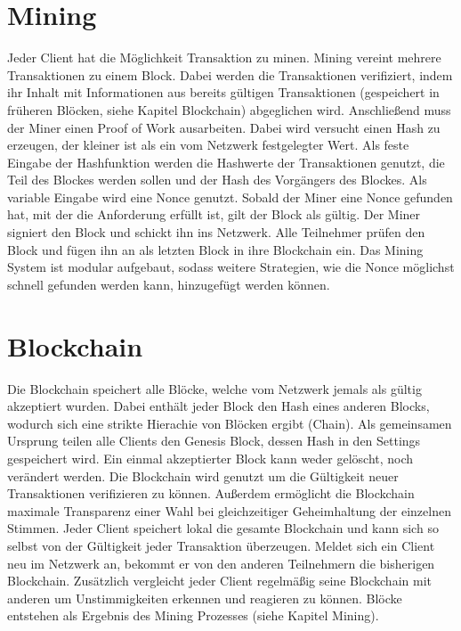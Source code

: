 \documentclass[colorback,accentcolor=tud1b]{tudreport}
\begin{document}
\section{Mining}
Jeder Client hat die Möglichkeit Transaktion zu minen. Mining vereint mehrere Transaktionen zu einem Block. Dabei werden die Transaktionen verifiziert, indem ihr Inhalt mit Informationen aus bereits gültigen Transaktionen (gespeichert in früheren Blöcken, siehe Kapitel Blockchain) abgeglichen wird. Anschließend muss der Miner einen Proof of Work ausarbeiten. Dabei wird versucht einen Hash zu erzeugen, der kleiner ist als ein vom Netzwerk festgelegter Wert. Als feste Eingabe der Hashfunktion werden die Hashwerte der Transaktionen genutzt, die Teil des Blockes werden sollen und der Hash des Vorgängers des Blockes. Als variable Eingabe wird eine Nonce genutzt. Sobald der Miner eine Nonce gefunden hat, mit der die Anforderung erfüllt ist, gilt der Block als gültig. Der Miner signiert den Block und schickt ihn ins Netzwerk. Alle Teilnehmer prüfen den Block und fügen ihn an als letzten Block in ihre Blockchain ein. Das Mining System ist modular aufgebaut, sodass weitere Strategien, wie die Nonce möglichst schnell gefunden werden kann, hinzugefügt werden können.
\section{Blockchain}
Die Blockchain speichert alle Blöcke, welche vom Netzwerk jemals als gültig akzeptiert wurden. Dabei enthält jeder Block den Hash eines anderen Blocks, wodurch sich eine strikte Hierachie von Blöcken ergibt (Chain). Als gemeinsamen Ursprung teilen alle Clients den Genesis Block, dessen Hash in den Settings gespeichert wird. Ein einmal akzeptierter Block kann weder gelöscht, noch verändert werden. Die Blockchain wird genutzt um die Gültigkeit neuer Transaktionen verifizieren zu können. Außerdem ermöglicht die Blockchain maximale Transparenz einer Wahl bei gleichzeitiger Geheimhaltung der einzelnen Stimmen. Jeder Client speichert lokal die gesamte Blockchain und kann sich so selbst von der Gültigkeit jeder Transaktion überzeugen. Meldet sich ein Client neu im Netzwerk an, bekommt er von den anderen Teilnehmern die bisherigen Blockchain. Zusätzlich vergleicht jeder Client regelmäßig seine Blockchain mit anderen um Unstimmigkeiten erkennen und reagieren zu können. Blöcke entstehen als Ergebnis des Mining Prozesses (siehe Kapitel Mining).
\end{document}
